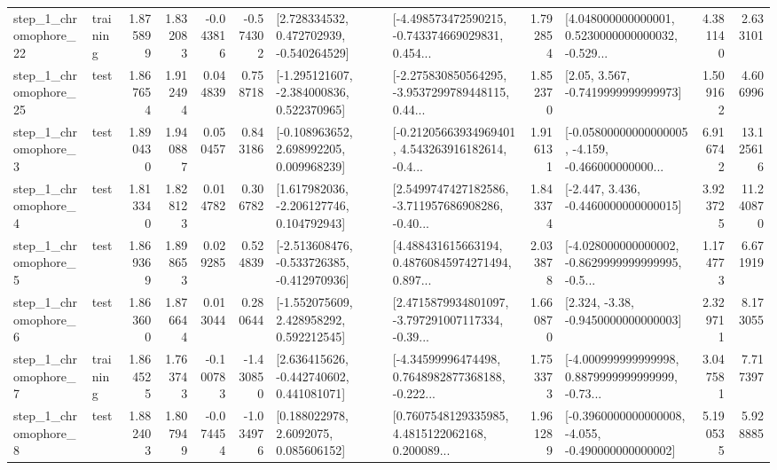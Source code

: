 \begin{tabular}{llrrrrllrlrr}
    step\_1\_chromophore\_22 &  training &      1.875899 &    1.832083 &     -0.043816 & -0.574302 &    [2.728334532, 0.472702939, -0.540264529] &  [-4.498573472590215, -0.743374669029831, 0.454... &       1.792854 &  [4.048000000000001, 0.5230000000000032, -0.529... &            4.381140 &          2.633101 \\
    step\_1\_chromophore\_25 &      test &      1.867654 &    1.912494 &      0.044839 &  0.758718 &   [-1.295121607, -2.384000836, 0.522370965] &  [-2.275830850564295, -3.9537299789448115, 0.44... &       1.852370 &                 [2.05, 3.567, -0.7419999999999973] &            1.509162 &          4.606996 \\
     step\_1\_chromophore\_3 &      test &      1.890430 &    1.940887 &      0.050457 &  0.843186 &    [-0.108963652, 2.698992205, 0.009968239] &  [-0.21205663934969401, 4.543263916182614, -0.4... &       1.916131 &  [-0.05800000000000005, -4.159, -0.466000000000... &            6.916742 &         13.125616 \\
     step\_1\_chromophore\_4 &      test &      1.813340 &    1.828123 &      0.014782 &  0.306782 &    [1.617982036, -2.206127746, 0.104792943] &  [2.5499747427182586, -3.711957686908286, -0.40... &       1.843374 &               [-2.447, 3.436, -0.4460000000000015] &            3.923725 &         11.240870 \\
     step\_1\_chromophore\_5 &      test &      1.869369 &    1.898653 &      0.029285 &  0.524839 &  [-2.513608476, -0.533726385, -0.412970936] &  [4.488431615663194, 0.48760845974271494, 0.897... &       2.033878 &  [-4.028000000000002, -0.8629999999999995, -0.5... &            1.174773 &          6.671919 \\
     step\_1\_chromophore\_6 &      test &      1.863600 &    1.876644 &      0.013044 &  0.280644 &    [-1.552075609, 2.428958292, 0.592212545] &  [2.4715879934801097, -3.797291007117334, -0.39... &       1.660870 &                [2.324, -3.38, -0.9450000000000003] &            2.329711 &          8.173055 \\
     step\_1\_chromophore\_7 &  training &      1.864525 &    1.763743 &     -0.100783 & -1.430850 &    [2.636415626, -0.442740602, 0.441081071] &  [-4.34599996474498, 0.7648982877368188, -0.222... &       1.753373 &  [-4.000999999999998, 0.8879999999999999, -0.73... &            3.047581 &          7.717397 \\
     step\_1\_chromophore\_8 &      test &      1.882403 &    1.807949 &     -0.074454 & -1.034976 &       [0.188022978, 2.6092075, 0.085606152] &  [0.7607548129335985, 4.4815122062168, 0.200089... &       1.961289 &  [-0.3960000000000008, -4.055, -0.490000000000002] &            5.190535 &          5.928885 \\

\end{tabular}

